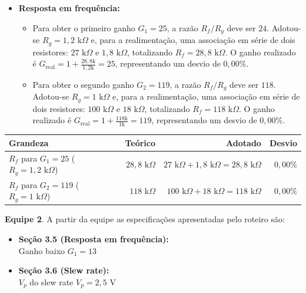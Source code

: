 \documentclass[11pt,a4paper]{article}
\begin{document}
\begin{itemize}

    \item \textbf{Resposta em frequência:}
    \begin{itemize}

        \item Para obter o primeiro ganho $G_1=25$, a razão $R_f/R_g$ deve ser $24$. Adotou-se $R_g=1{,}2\text{ k}\Omega$ e, para a realimentação, uma associação em série de dois resistores: $27\text{ k}\Omega$ e $1{,}8\text{ k}\Omega$, totalizando $R_f=28{,}8\text{ k}\Omega$. O ganho realizado é $G_{\text{real}}=1+\frac{28{,}8\text{k}}{1{,}2\text{k}}=25$, representando um desvio de $0{,}00\%$.

        \item Para obter o segundo ganho $G_2=119$, a razão $R_f/R_g$ deve ser $118$. Adotou-se $R_g=1\text{ k}\Omega$ e, para a realimentação, uma associação em série de dois resistores: $100\text{ k}\Omega$ e $18\text{ k}\Omega$, totalizando $R_f=118\text{ k}\Omega$. O ganho realizado é $G_{\text{real}}=1+\frac{118\text{k}}{1\text{k}}=119$, representando um desvio de $0{,}00\%$.

    \end{itemize}
\end{itemize}

\begin{center}
\renewcommand{\arraystretch}{1.2}
\begin{tabular}{@{}lrrr@{}}
\toprule
\textbf{Grandeza} & \textbf{Teórico} & \textbf{Adotado} & \textbf{Desvio} \\
\midrule
$R_f$ para $G_1=25$ ($R_g=1{,}2\text{ k}\Omega$) & $28{,}8\text{ k}\Omega$ & $27\text{ k}\Omega+1{,}8\text{ k}\Omega=28{,}8\text{ k}\Omega$ & $0{,}00\%$ \\
$R_f$ para $G_2=119$ ($R_g=1\text{ k}\Omega$) & $118\text{ k}\Omega$ & $100\text{ k}\Omega+18\text{ k}\Omega=118\text{ k}\Omega$ & $0{,}00\%$ \\
\bottomrule
\end{tabular}
\end{center}

\begin{especbancada}
\textbf{Equipe 2}. A partir da equipe as especificações apresentadas pelo roteiro são:

\begin{itemize}
    \item \textbf{Seção 3.5 (Resposta em frequência):} \\
    Ganho baixo $G_1=13$

    \vspace{0.3cm}
    
    \item \textbf{Seção 3.6 (Slew rate):} \\
    $V_{p}$ do slew rate $V_{p}=2{,}5 \text{ V}$
    
\end{itemize}
\end{especbancada}
\end{document}
